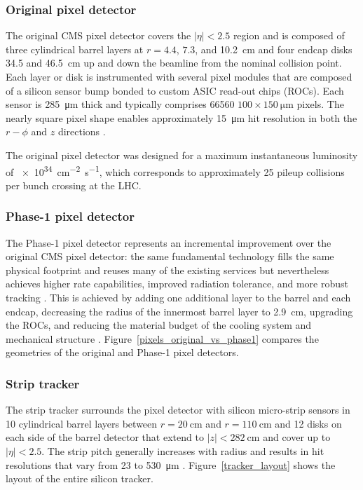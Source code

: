 
\subsubsection{Original pixel detector}
The original CMS pixel detector covers the $|\eta|<2.5$ region and is composed of three cylindrical barrel layers at $r=4.4$, $7.3$, and \SI{10.2}{\cm} and four endcap disks \num{34.5} and \SI{46.5}{\cm} up and down the beamline from the nominal collision point. Each layer or disk is instrumented with several pixel modules that are composed of a silicon sensor bump bonded to custom ASIC read-out chips (ROCs). Each sensor is \SI{285}{\um} thick and typically comprises 66560 $100\times\SI{150}{\um}$ pixels. The nearly square pixel shape enables approximately \SI{15}{\um} hit resolution in both the $r-\phi$ and $z$ directions \cite{cms_tdr_v1, cms_experiment}.

The original pixel detector was designed for a maximum instantaneous luminosity of \SI{e34}{\cm\tothe{-2}\s\tothe{-1}}, which corresponds to approximately 25 pileup collisions per bunch crossing at the LHC.


\subsubsection{Phase-1 pixel detector}
The Phase-1 pixel detector represents an incremental improvement over the original CMS pixel detector: the same fundamental technology fills the same physical footprint and reuses many of the existing services but nevertheless achieves higher rate capabilities, improved radiation tolerance, and more robust tracking \cite{cms_phase1_pixels}. This is achieved by adding one additional layer to the barrel and each endcap, decreasing the radius of the innermost barrel layer to \SI{2.9}{\cm}, upgrading the ROCs, and reducing the material budget of the cooling system and mechanical structure \cite{cms_phase1_pixels, cms_phase1_pixel_tdr}. Figure~\ref{pixels_original_vs_phase1} compares the geometries of the original and Phase-1 pixel detectors.


\subsubsection{Strip tracker}
The strip tracker surrounds the pixel detector with silicon micro-strip sensors in 10 cylindrical barrel layers between $r=\SI{20}{\cm}$ and $r=\SI{110}{\cm}$ and 12 disks on each side of the barrel detector that extend to $|z|<\SI{282}{\cm}$ and cover up to $|\eta|<2.5$. The strip pitch generally increases with radius and results in hit resolutions that vary from \num{23} to \SI{530}{\um} \cite{cms_experiment}. Figure~\ref{tracker_layout} shows the layout of the entire silicon tracker.

